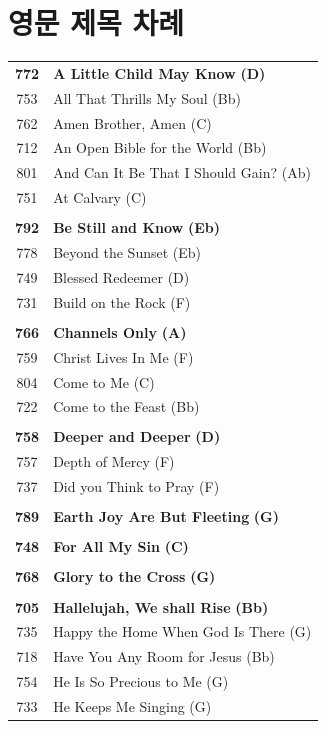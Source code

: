 \section*{영문 제목 차례}
\begin{supertabular}{c l}
\textbf{772} & \textbf{A Little Child May Know} \textbf{(D)} \\
753 & All That Thrills My Soul (Bb) \\
762 & Amen Brother, Amen (C) \\
712 & An Open Bible for the World (Bb) \\
801 & And Can It Be That I Should Gain? (Ab) \\
751 & At Calvary (C) \\
 & \\
\textbf{792} & \textbf{Be Still and Know} \textbf{(Eb)} \\
778 & Beyond the Sunset (Eb) \\
749 & Blessed Redeemer (D) \\
731 & Build on the Rock (F) \\
 & \\
\textbf{766} & \textbf{Channels Only} \textbf{(A)} \\
759 & Christ Lives In Me (F) \\
804 & Come to Me (C) \\
722 & Come to the Feast (Bb) \\
 & \\
\textbf{758} & \textbf{Deeper and Deeper} \textbf{(D)} \\
757 & Depth of Mercy (F) \\
737 & Did you Think to Pray (F) \\
 & \\
\textbf{789} & \textbf{Earth Joy Are But Fleeting} \textbf{(G)} \\
 & \\
\textbf{748} & \textbf{For All My Sin} \textbf{(C)} \\
 & \\
\textbf{768} & \textbf{Glory to the Cross} \textbf{(G)} \\
 & \\
\textbf{705} & \textbf{Hallelujah, We shall Rise} \textbf{(Bb)} \\
735 & Happy the Home When God Is There (G) \\
718 & Have You Any Room for Jesus (Bb) \\
754 & He Is So Precious to Me (G) \\
733 & He Keeps Me Singing (G) \\

\end{supertabular}
